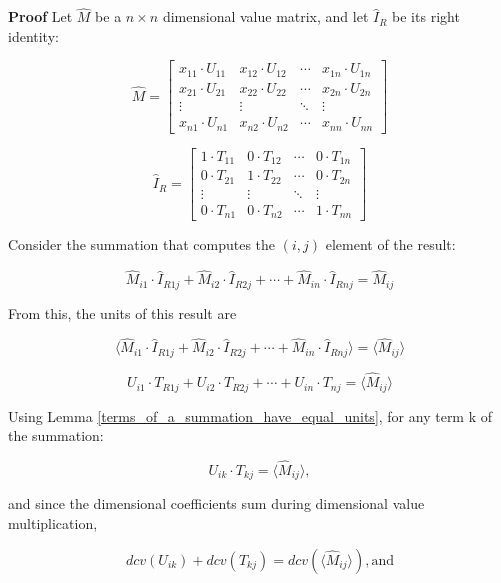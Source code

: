 \documentclass[10pt,letterpaper]{article}
\newenvironment{proof}{\noindent\textbf{Proof} }{\qed \newline}
\newcommand{\qed}{\nobreak \ifvmode \relax \else
      \ifdim\lastskip<1.5em \hskip-\lastskip
      \hskip1.5em plus0em minus0.5em \fi \nobreak
      \vrule height0.75em width0.5em depth0.25em\fi}
\numberwithin{equation}{section}
\begin{document}
\begin{proof}Let $\hat M$ be a $n \times n$ dimensional value matrix, and let $\hat I_R$ be its right identity:

\[ \hat M = \left[ \begin{matrix} 
  x_{11} \cdot U_{11} & x_{12} \cdot U_{12} & \cdots & x_{1n} \cdot U_{1n} \\
  x_{21} \cdot U_{21} & x_{22} \cdot U_{22} & \cdots & x_{2n} \cdot U_{2n} \\
  \vdots & \vdots & \ddots & \vdots \\
  x_{n1} \cdot U_{n1} & x_{n2} \cdot U_{n2} & \cdots & x_{nn} \cdot U_{nn}
 \end{matrix} \right] \]

\[ \hat I_R = \left[ \begin{matrix} 
  1 \cdot T_{11} & 0 \cdot T_{12} & \cdots & 0 \cdot T_{1n} \\
  0 \cdot T_{21} & 1 \cdot T_{22} & \cdots & 0 \cdot T_{2n} \\
  \vdots & \vdots & \ddots & \vdots \\
  0 \cdot T_{n1} & 0 \cdot T_{n2} & \cdots & 1 \cdot T_{nn}
 \end{matrix} \right] \]

Consider the summation that computes the $(i, j)$ element of the result:

\[ \hat M_{i1} \cdot \hat I_{R1j} + \hat M_{i2} \cdot \hat I_{R2j} +\cdots + \hat M_{in} \cdot \hat I_{Rnj} = \hat M_{ij} \]

From this, the units of this result are

\[ \langle \hat M_{i1} \cdot \hat I_{R1j} + \hat M_{i2} \cdot \hat I_{R2j} +\cdots + \hat M_{in} \cdot \hat I_{Rnj} \rangle = \langle \hat M_{ij} \rangle \]

\[ U_{i1} \cdot T_{R1j} + U_{i2} \cdot T_{R2j} +\cdots + U_{in} \cdot T_{nj} = \langle \hat M_{ij} \rangle \]

Using Lemma \ref{terms_of_a_summation_have_equal_units}, for any term k of the summation:

\[ U_{ik} \cdot T_{kj} = \langle \hat M_{ij} \rangle , \]

and since the dimensional coefficients sum during dimensional value multiplication,

\begin{equation} \label{basic_equation_1_for_right_identity_ddv_proof} 
dcv(U_{ik}) + dcv(T_{kj}) = dcv( \langle \hat M_{ij} \rangle ) , \mbox{and} \end{equation}


\end{proof}
\end{document}
